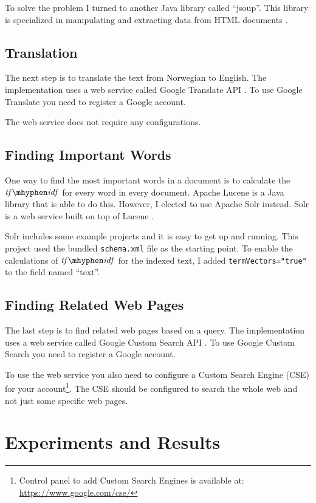 \documentclass[a4paper]{book}
\newcommand\tfidf{\mathit{tf\mhyphen idf}}
\begin{document}
To solve the problem I turned to another Java library called ``jsoup''. This library is specialized in manipulating and extracting data from HTML documents \cite{aboutJsoup}.

\section{Translation}
\label{sec:translation}

The next step is to translate the text from Norwegian to English. The implementation uses a web service called Google Translate API \cite{aboutGoogleTranslate}. To use Google Translate you need to register a Google account.

The web service does not require any configurations.

\section{Finding Important Words}
\label{sec:findingImportantWords}

One way to find the most important words in a document is to calculate the $\tfidf$ for every word in every document. Apache Lucene is a Java library that is able to do this. However, I elected to use Apache Solr instead. Solr is a web service built on top of Lucene \cite{aboutSolr}.

Solr includes some example projects and it is easy to get up and running. This project used the bundled \verb|schema.xml| file as the starting point. To enable the calculations of $\tfidf$ for the indexed text, I added \verb|termVectors="true"| to the field named ``text''.

\section{Finding Related Web Pages}
\label{sec:searchEngine}

The last step is to find related web pages based on a query. The implementation uses a web service called Google Custom Search API \cite{aboutGoogleSearch}. To use Google Custom Search you need to register a Google account.

To use the web service you also need to configure a Custom Search Engine (CSE) for your account\footnote{Control panel to add Custom Search Engines is available at: \url{https://www.google.com/cse/}}. The CSE should be configured to search the whole web and not just some specific web pages.

\chapter{Experiments and Results}
\label{cha:experimentsAndResults}
\end{document}

